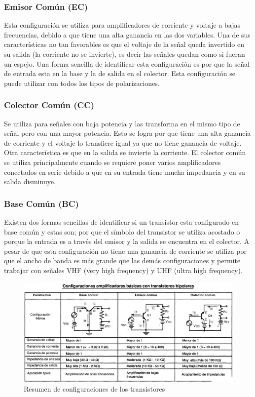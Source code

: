\subsubsection{Emisor Común (EC)}

Esta configuración se utiliza para amplificadores de corriente y voltaje a bajas frecuencias, debido a que tiene una alta ganancia en las dos variables. Una de sus características no tan favorables es que el voltaje de la señal queda invertido en su salida (la corriente no se invierte), es decir las señales quedan como si fueran un espejo. Una forma sencilla de identificar esta configuración es por que la señal de entrada esta en la base y la de salida en el colector. Esta configuración se puede utilizar con todos los tipos de polarizaciones.

\subsubsection{Colector Común (CC)}

Se utiliza para señales con baja potencia y las transforma en el mismo tipo de señal pero con una mayor potencia. Esto se logra por que tiene una alta ganancia de corriente y el voltaje lo transfiere igual ya que no tiene ganancia de voltaje. Otra característica es que en la salida se invierte la corriente. El colector común se utiliza principalmente cuando se requiere poner varios amplificadores conectados en serie debido a que en su entrada tiene mucha impedancia y en su salida disminuye.


\subsubsection{Base Común (BC)} Existen dos formas sencillas de identificar si un transistor esta configurado en base común y estas son; por que el símbolo del transistor se utiliza acostado o porque la entrada es a través del emisor y la salida se encuentra en el colector. A pesar de que esta configuración no tiene una ganancia de corriente se utiliza por que el ancho de banda es más grande que las demás configuraciones y permite trabajar con señales VHF (very high frequency) y UHF (ultra high frequency).


\begin{figure}[H]
    \centering
    \includegraphics[width=\textwidth]{Imagenes/Configuraciones BJT basicas.jpg}
    \caption{Resumen de configuraciones de los transistores}
    \label{fig:configuraciones}
\end{figure}

